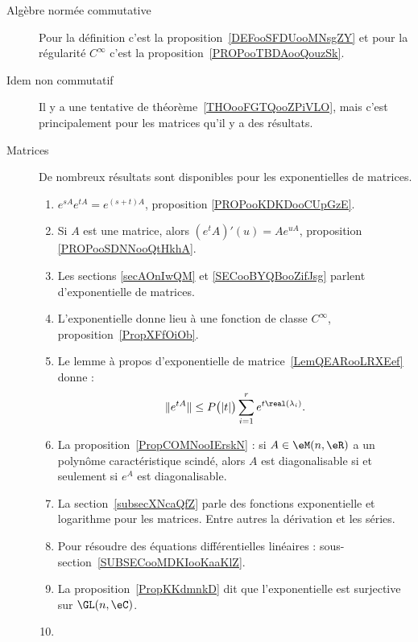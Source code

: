 \begin{description}
	\item[Algèbre normée commutative]

	      Pour la définition c'est la proposition~\ref{DEFooSFDUooMNsgZY} et pour la régularité \(  C^{\infty}\) c'est la proposition~\ref{PROPooTBDAooQouzSk}.

	\item[Idem non commutatif]

	      Il y a une tentative de théorème~\ref{THOooFGTQooZPiVLO}, mais c'est principalement pour les matrices qu'il y a des résultats.

	\item[Matrices]

	      De nombreux résultats sont disponibles pour les exponentielles de matrices.

	      \begin{enumerate}
		      \item
		            \( e^{sA} e^{tA}= e^{(s+t)A}\), proposition \ref{PROPooKDKDooCUpGzE}.
		      \item
		            Si \( A\) est une matrice, alors \( (e^tA)'(u)=Ae^{uA}\), proposition \ref{PROPooSDNNooQtHkhA}.
		      \item
		            Les sections \ref{secAOnIwQM} et \ref{SECooBYQBooZifJsg} parlent d'exponentielle de matrices.
		      \item
		            L'exponentielle donne lieu à une fonction de classe \(  C^{\infty}\), proposition~\ref{PropXFfOiOb}.
		      \item
		            Le lemme à propos d'exponentielle de matrice~\ref{LemQEARooLRXEef} donne :
		            \begin{equation*}
			            \|  e^{tA} \|\leq P\big( | t | \big)\sum_{i=1}^r e^{t\real(\lambda_i)}.
		            \end{equation*}
		      \item
		            La proposition~\ref{PropCOMNooIErskN} : si \( A\in \eM(n,\eR)\) a un polynôme caractéristique scindé, alors \( A\) est diagonalisable si et seulement si \( e^A\) est diagonalisable.
		      \item
		            La section~\ref{subsecXNcaQfZ} parle des fonctions exponentielle et logarithme pour les matrices. Entre autres la dérivation et les séries.
		      \item
		            Pour résoudre des équations différentielles linéaires : sous-section~\ref{SUBSECooMDKIooKaaKlZ}.
		      \item
		            La proposition~\ref{PropKKdmnkD} dit que l'exponentielle est surjective sur \( \GL(n,\eC)\).
		      \item


\end{enumerate}
\end{description}
